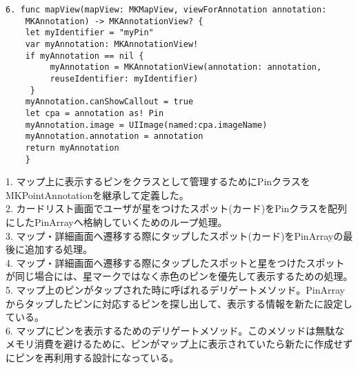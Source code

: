 \begin{description}
\begin{lstlisting}[basicstyle=\ttfamily\footnotesize, frame=single]
6. func mapView(mapView: MKMapView, viewForAnnotation annotation: 
    MKAnnotation) -> MKAnnotationView? {
    let myIdentifier = "myPin"
    var myAnnotation: MKAnnotationView!
    if myAnnotation == nil {
         myAnnotation = MKAnnotationView(annotation: annotation,
         reuseIdentifier: myIdentifier)
     }
    myAnnotation.canShowCallout = true
    let cpa = annotation as! Pin
    myAnnotation.image = UIImage(named:cpa.imageName)
    myAnnotation.annotation = annotation
    return myAnnotation
    }

 \end{lstlisting}

1. マップ上に表示するピンをクラスとして管理するためにPinクラスをMKPointAnnotationを継承して定義した。\\
2. カードリスト画面でユーザが星をつけたスポット(カード)をPinクラスを配列にしたPinArrayへ格納していくためのループ処理。\\
3. マップ・詳細画面へ遷移する際にタップしたスポット(カード)をPinArrayの最後に追加する処理。\\
4. マップ・詳細画面へ遷移する際にタップしたスポットと星をつけたスポットが同じ場合には、星マークではなく赤色のピンを優先して表示するための処理。\\
5. マップ上のピンがタップされた時に呼ばれるデリゲートメソッド。PinArrayからタップしたピンに対応するピンを探し出して、表示する情報を新たに設定している。\\
6. マップにピンを表示するためのデリゲートメソッド。このメソッドは無駄なメモリ消費を避けるために、ピンがマップ上に表示されていたら新たに作成せずにピンを再利用する設計になっている。\\
\end{description}
